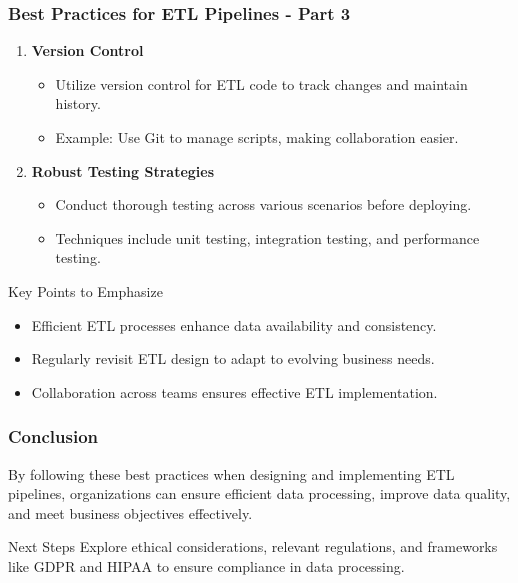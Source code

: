 \documentclass[aspectratio=169]{beamer}
\begin{document}
\begin{frame}
    \frametitle{Best Practices for ETL Pipelines - Part 3}
    \begin{enumerate}[resume]
        \item \textbf{Version Control}
        \begin{itemize}
            \item Utilize version control for ETL code to track changes and maintain history.
            \item Example: Use Git to manage scripts, making collaboration easier.
        \end{itemize}

        \item \textbf{Robust Testing Strategies}
        \begin{itemize}
            \item Conduct thorough testing across various scenarios before deploying.
            \item Techniques include unit testing, integration testing, and performance testing.
        \end{itemize}
    \end{enumerate}
    
    \begin{block}{Key Points to Emphasize}
        \begin{itemize}
            \item Efficient ETL processes enhance data availability and consistency.
            \item Regularly revisit ETL design to adapt to evolving business needs.
            \item Collaboration across teams ensures effective ETL implementation.
        \end{itemize}
    \end{block}
\end{frame}

\begin{frame}
    \frametitle{Conclusion}
    By following these best practices when designing and implementing ETL pipelines, organizations can ensure efficient data processing, improve data quality, and meet business objectives effectively.

    \begin{block}{Next Steps}
        Explore ethical considerations, relevant regulations, and frameworks like GDPR and HIPAA to ensure compliance in data processing.
    \end{block}
\end{frame}
\end{document}

